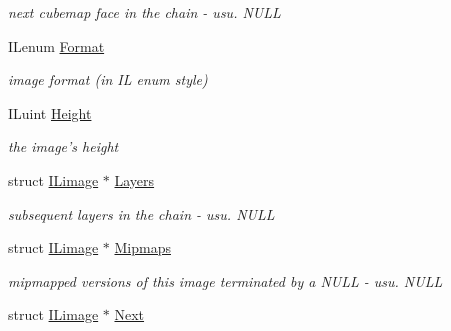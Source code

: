 \begin{DoxyCompactItemize}
\begin{DoxyCompactList}\small\item\em next cubemap face in the chain -\/ usu. N\+U\+L\+L \end{DoxyCompactList}\item 
\hypertarget{struct_i_limage_aab6d023e52ab2d90be412df75a42abfb}{I\+Lenum \hyperlink{struct_i_limage_aab6d023e52ab2d90be412df75a42abfb}{Format}}\label{struct_i_limage_aab6d023e52ab2d90be412df75a42abfb}

\begin{DoxyCompactList}\small\item\em image format (in I\+L enum style) \end{DoxyCompactList}\item 
\hypertarget{struct_i_limage_a8a8093d76b61a95fc96df24af29b107a}{I\+Luint \hyperlink{struct_i_limage_a8a8093d76b61a95fc96df24af29b107a}{Height}}\label{struct_i_limage_a8a8093d76b61a95fc96df24af29b107a}

\begin{DoxyCompactList}\small\item\em the image's height \end{DoxyCompactList}\item 
\hypertarget{struct_i_limage_ab9677b31b029dff8fecf52eef54223e8}{struct \hyperlink{struct_i_limage}{I\+Limage} $\ast$ \hyperlink{struct_i_limage_ab9677b31b029dff8fecf52eef54223e8}{Layers}}\label{struct_i_limage_ab9677b31b029dff8fecf52eef54223e8}

\begin{DoxyCompactList}\small\item\em subsequent layers in the chain -\/ usu. N\+U\+L\+L \end{DoxyCompactList}\item 
\hypertarget{struct_i_limage_a7ebe7b0ac80e0ff043b4339aec9bd202}{struct \hyperlink{struct_i_limage}{I\+Limage} $\ast$ \hyperlink{struct_i_limage_a7ebe7b0ac80e0ff043b4339aec9bd202}{Mipmaps}}\label{struct_i_limage_a7ebe7b0ac80e0ff043b4339aec9bd202}

\begin{DoxyCompactList}\small\item\em mipmapped versions of this image terminated by a N\+U\+L\+L -\/ usu. N\+U\+L\+L \end{DoxyCompactList}\item 
\hypertarget{struct_i_limage_a996f4ecbbfd30cc5868deb90cca0bf39}{struct \hyperlink{struct_i_limage}{I\+Limage} $\ast$ \hyperlink{struct_i_limage_a996f4ecbbfd30cc5868deb90cca0bf39}{Next}}\label{struct_i_limage_a996f4ecbbfd30cc5868deb90cca0bf39}


\end{DoxyCompactItemize}
